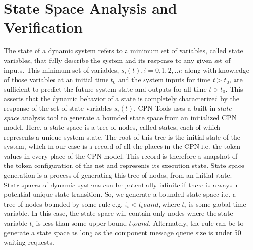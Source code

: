 \chapter{State Space Analysis and Verification}
\label{chapter:analysis}

The state of a dynamic system refers to a minimum set of variables, called state variables, that fully describe the system and its response to any given set of inputs. This minimum set of variables, $s_i(t), i=0,1,2,..n$ along with knowledge of those variables at an initial time $t_0$ and the system inputs for time $t > t_0$, are sufficient to predict the future system state and outputs for all time $t > t_0$. This asserts that the dynamic behavior of a state is completely characterized by the response of the set of state variables $s_i(t)$. CPN Tools uses a built-in \emph{state space} analysis tool to generate a bounded state space from an initialized CPN model. Here, a state space is a tree of nodes, called states, each of which represents a unique system state. The root of this tree is the initial state of the system, which in our case is a record of all the places in the CPN i.e. the token values in every place of the CPN model. This record is therefore a snapshot of the token configuration of the net and represents its execution state. State space generation is a process of generating this tree of nodes, from an initial state. State spaces of dynamic systems can be potentially infinite if there is always a potential unique state transition. So, we generate a bounded state space i.e. a tree of nodes bounded by some rule e.g. $t_i < t_bound$, where $t_i$ is some global time variable. In this case, the state space will contain only nodes where the state variable $t_i$ is less than some upper bound $t_bound$. Alternately, the rule can be to generate a state space as long as the component message queue size is under 50 waiting requests. 

